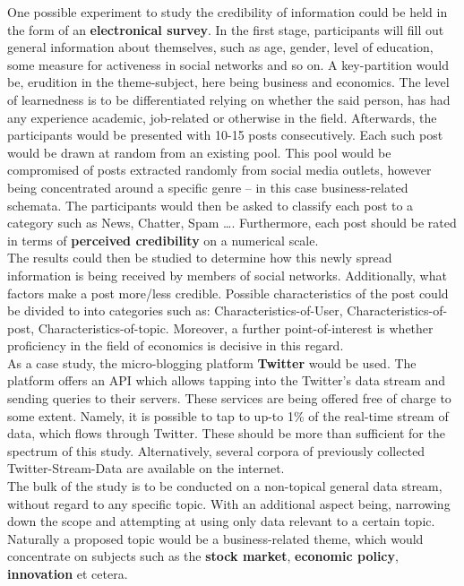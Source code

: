 \documentclass[12pt]{article}
\begin{document}
One possible experiment to study the credibility of information could be held in the form of an \textbf{electronical survey}. In the first stage, participants will fill out general information about themselves, such as age, gender, level of education, some measure for activeness in social networks and so on. A key-partition would be, erudition in the theme-subject, here being business and economics. The level of learnedness is to be differentiated relying on whether the said person, has had any experience academic, job-related or otherwise in the field. Afterwards, the participants would be presented with 10-15 posts consecutively. Each such post would be drawn at random from an existing pool. This pool would be compromised of posts extracted randomly from social media outlets, however being concentrated around a specific genre – in this case business-related schemata. The participants would then be asked to classify each post to a category such as {News, Chatter, Spam …}. Furthermore, each post should be rated in terms of \textbf{perceived credibility} on a numerical scale. 
\\

The results could then be studied to determine how this newly spread information is being received by members of social networks. Additionally, what factors make a post more/less credible. Possible characteristics of the post could be divided to into categories such as: Characteristics-of-User, Characteristics-of-post, Characteristics-of-topic. Moreover, a further point-of-interest is whether proficiency in the field of economics is decisive in this regard.
\\

As a case study, the micro-blogging platform \textbf{Twitter} would be used. The platform offers an API which allows tapping into the Twitter’s data stream and sending queries to their servers. These services are being offered free of charge to some extent. Namely, it is possible to tap to up-to 1\% of the real-time stream of data, which flows through Twitter. These should be more than sufficient for the spectrum of this study. Alternatively, several corpora of previously collected Twitter-Stream-Data are available on the internet. 
\\

The bulk of the study is to be conducted on a non-topical general data stream, without regard to any specific topic. With an additional aspect being, narrowing down the scope and attempting at using only data relevant to a certain topic. Naturally a proposed topic would be a business-related theme, which would concentrate on subjects such as the \textbf{stock market}, \textbf{economic policy}, \textbf{innovation} et cetera. 
\\
\end{document}
